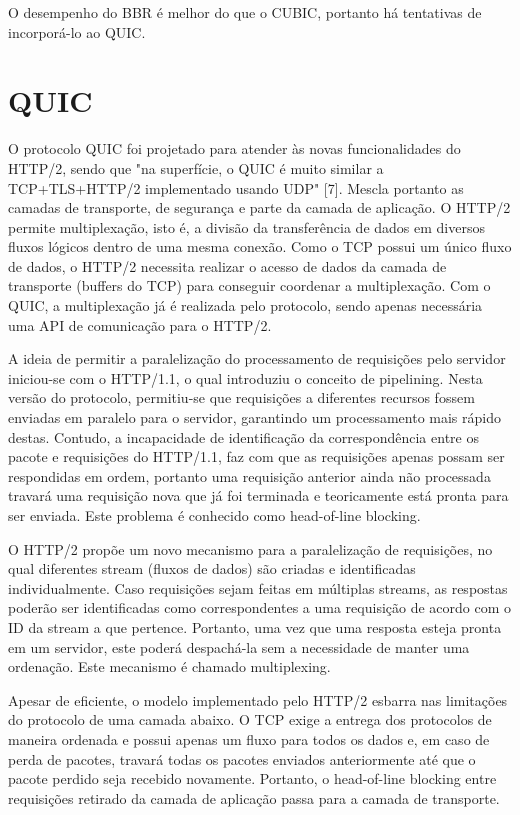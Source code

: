 \documentclass{article}
\begin{document}
O desempenho do BBR é melhor do que o CUBIC, portanto há tentativas de incorporá-lo ao QUIC.

\section{QUIC}
O protocolo QUIC foi projetado para atender às novas funcionalidades do HTTP/2, sendo que "na superfície, o QUIC é muito
similar a TCP+TLS+HTTP/2 implementado usando UDP" [7]. Mescla portanto as camadas de transporte, de segurança e parte da
camada de aplicação. O HTTP/2 permite multiplexação, isto é, a divisão da transferência de dados em diversos fluxos
lógicos dentro de uma mesma conexão. Como o TCP possui um único fluxo de dados, o HTTP/2 necessita realizar o acesso de
dados da camada de transporte (buffers do TCP) para conseguir coordenar a multiplexação. Com o QUIC, a multiplexação já
é realizada pelo protocolo, sendo apenas necessária uma API de comunicação para o HTTP/2.

A ideia de permitir a paralelização do processamento de requisições pelo servidor iniciou-se com o HTTP/1.1, o qual
introduziu o conceito de pipelining. Nesta versão do protocolo, permitiu-se que requisições a diferentes recursos fossem
enviadas em paralelo para o servidor, garantindo um processamento mais rápido destas. Contudo, a incapacidade de
identificação da correspondência entre os pacote e requisições do HTTP/1.1, faz com que as requisições apenas possam ser
respondidas em ordem, portanto uma requisição anterior ainda não processada travará uma requisição nova que já foi
terminada e teoricamente está pronta para ser enviada. Este problema é conhecido como head-of-line blocking.

O HTTP/2 propõe um novo mecanismo para a paralelização de requisições, no qual diferentes stream (fluxos de dados) são
criadas e identificadas individualmente. Caso requisições sejam feitas em múltiplas streams, as respostas poderão ser
identificadas como correspondentes a uma requisição de acordo com o ID da stream a que pertence. Portanto, uma vez que
uma resposta esteja pronta em um servidor, este poderá despachá-la sem a necessidade de manter uma ordenação. Este
mecanismo é chamado multiplexing.

Apesar de eficiente, o modelo implementado pelo HTTP/2 esbarra nas limitações do protocolo de uma camada abaixo. O TCP
exige a entrega dos protocolos de maneira ordenada e possui apenas um fluxo para todos os dados e, em caso de perda de
pacotes, travará todas os pacotes enviados anteriormente até que o pacote perdido seja recebido novamente. Portanto, o
head-of-line blocking entre requisições retirado da camada de aplicação passa para a camada de transporte. 
\end{document}
